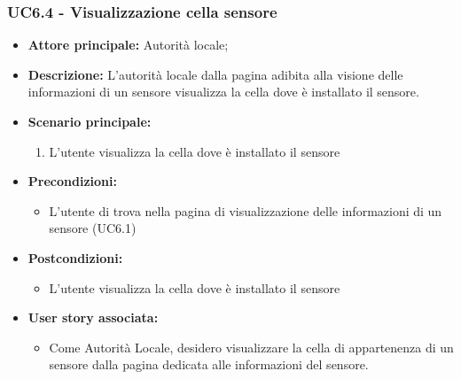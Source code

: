 \documentclass{article}
\begin{document}
\subsubsection{UC6.4 - Visualizzazione cella sensore}
\begin{itemize}
    \item \textbf{Attore principale:} Autorità locale;
    \item \textbf{Descrizione:} L’autorità locale dalla pagina adibita alla visione delle informazioni di un sensore visualizza la cella dove è installato il sensore.
    \item \textbf{Scenario principale:}
          \begin{enumerate}
              \item L'utente visualizza la cella dove è installato il sensore
          \end{enumerate}
    \item \textbf{Precondizioni:}
          \begin{itemize}
              \item  L'utente di trova nella pagina di visualizzazione delle informazioni di un sensore (UC6.1)
          \end{itemize}
    \item \textbf{Postcondizioni:}
          \begin{itemize}
              \item  L'utente visualizza la cella dove è installato il sensore
          \end{itemize}
    \item \textbf{User story associata:}
          \begin{itemize}
              \item Come Autorità Locale, desidero visualizzare la cella di appartenenza di un sensore dalla pagina dedicata alle informazioni del sensore.
          \end{itemize}
\end{itemize}
\end{document}

